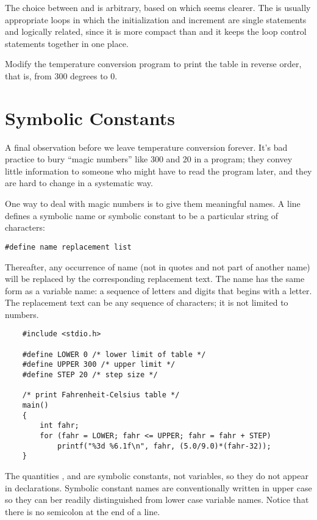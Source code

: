 The choice between  and  is arbitrary, based on which seems clearer.
The  is usually appropriate  loops in which the initialization and increment are single statements and logically related, since it is more compact than  and it keeps the loop control statements together in one place.
\newline

\begin{ExerciseList}
\Exercise Modify the temperature conversion program to print the table in reverse order, that is, from 300 degrees to 0.
\end{ExerciseList}



\section{Symbolic Constants}


A final observation before we leave temperature conversion forever.
It's bad practice to bury ``magic numbers'' like 300 and 20 in a program; they convey little information to someone who might have to read the program later, and they are hard to change in a systematic way.

One way to deal with magic numbers is to give them meaningful names.
A  line defines a symbolic name or symbolic constant to be a particular string of characters:
\begin{lstlisting}[basicstyle=\ttfamily\normalsize\itshape, keywordstyle=\color{black}]
	#define name replacement list
\end{lstlisting}
Thereafter, any occurrence of name (not in quotes and not part of another name) will be replaced by the corresponding replacement text.
The name has the same form as a variable name: a sequence of letters and digits that begins with a letter.
The replacement text can be any sequence of characters; it is not limited to numbers.
\begin{lstlisting}
	#include <stdio.h>

	#define LOWER 0 /* lower limit of table */
	#define UPPER 300 /* upper limit */
	#define STEP 20 /* step size */

	/* print Fahrenheit-Celsius table */
	main()
	{
		int fahr;
		for (fahr = LOWER; fahr <= UPPER; fahr = fahr + STEP)
			printf("%3d %6.1f\n", fahr, (5.0/9.0)*(fahr-32));
	}
\end{lstlisting}

The quantities ,  and  are symbolic constants, not variables, so they do not appear in declarations.
Symbolic constant names are conventionally written in upper case so they can ber readily distinguished from lower case variable names.
Notice that there is no semicolon at the end of a  line.



